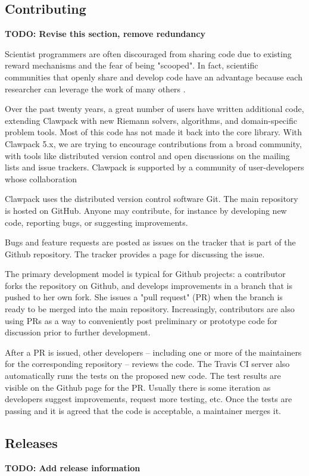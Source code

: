 \subsection{Contributing}

\textbf{TODO: Revise this section, remove redundancy}

Scientist programmers are often discouraged from sharing code
due to existing reward mechanisms and the fear of being "scooped".
In fact, scientific communities that openly share and develop code
have an advantage because each researcher can leverage the work of
many others \cite{turk2013scaling}.

Over the past twenty years, a great number of users have written
additional code, extending Clawpack with new Riemann solvers,
algorithms, and domain-specific problem tools.  Most of this code
has not made it back into the core library.  With Clawpack 5.x,
we are trying to encourage contributions from a broad community, with
tools like distributed version control and open discussions on 
the mailing lists and issue trackers.
Clawpack is supported by a community of user-developers whose
collaboration

Clawpack uses the distributed version control software Git.
The main repository is hosted on GitHub.  Anyone may contribute,
for instance by developing new code, reporting bugs, or suggesting
improvements.

Bugs and feature requests are posted as issues on the tracker that
is part of the Github repository.  The tracker provides a page for
discussing the issue.

The primary development model
is typical for Github projects: a contributor forks the repository on Github,
and develops improvements in a branch that is pushed to her own fork.
She issues a "pull request" (PR) when the branch is ready to be merged
into the main repository.  Increasingly, contributors are also using
PRs as a way to conveniently post preliminary or prototype code for
discussion prior to further development.

After a PR is issued, other developers -- including one or more of the
maintainers for the corresponding repository -- reviews the code.  The Travis
CI server also automatically runs the tests on the proposed new code.  The test
results are visible on the Github page for the PR.  Usually there is some
iteration as developers suggest improvements, request more testing, etc.
Once the tests are passing and it is agreed that the code is acceptable, a
maintainer merges it.

\subsection{Releases}

\textbf{TODO: Add release information}
